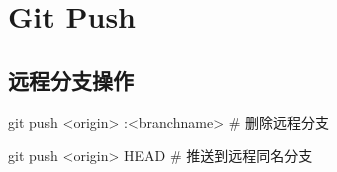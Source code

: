\chapter{Git Push}
\section{远程分支操作}
\begin{shellcmd}
git push <origin> :<branchname> # 删除远程分支

git push <origin> HEAD # 推送到远程同名分支
\end{shellcmd}
